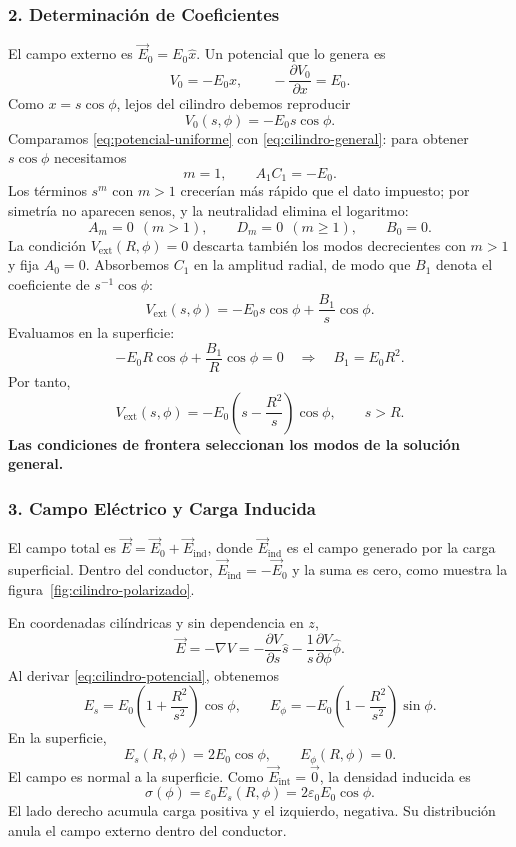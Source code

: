 \documentclass[11pt]{article}
\begin{document}
\subsubsection*{2. Determinación de Coeficientes}
El campo externo es $\vec{E}_0=E_0\hat{x}$. Un potencial que lo genera es
\[
 V_0=-E_0x,
 \qquad -\frac{\partial V_0}{\partial x}=E_0.
\]
Como $x=s\cos\phi$, lejos del cilindro debemos reproducir
\begin{equation}
 V_0(s,\phi)=-E_0s\cos\phi.
 \label{eq:potencial-uniforme}
\end{equation}
Comparamos \eqref{eq:potencial-uniforme} con
\eqref{eq:cilindro-general}: para obtener $s\cos\phi$ necesitamos
\[
 m=1,\qquad A_1C_1=-E_0.
\]
Los términos $s^m$ con $m>1$ crecerían más rápido que el dato impuesto;
por simetría no aparecen senos, y la neutralidad elimina el logaritmo:
\[
 A_m=0\ \ (m>1),\qquad D_m=0\ \ (m\geq1),\qquad B_0=0.
\]
La condición $V_{\mathrm{ext}}(R,\phi)=0$ descarta también los modos
decrecientes con $m>1$ y fija $A_0=0$. Absorbemos $C_1$ en la amplitud
radial, de modo que $B_1$ denota el coeficiente de $s^{-1}\cos\phi$:
\[
 V_{\mathrm{ext}}(s,\phi)
 =-E_0s\cos\phi+\frac{B_1}{s}\cos\phi.
\]
Evaluamos en la superficie:
\[
 -E_0R\cos\phi+\frac{B_1}{R}\cos\phi=0
 \quad\Longrightarrow\quad B_1=E_0R^2.
\]
Por tanto,
\begin{equation}
 \boxed{V_{\mathrm{ext}}(s,\phi)
 =-E_0\left(s-\frac{R^2}{s}\right)\cos\phi,\qquad s>R.}
 \label{eq:cilindro-potencial}
\end{equation}
\textbf{Las condiciones de frontera seleccionan los modos de la
solución general.}

\subsubsection*{3. Campo Eléctrico y Carga Inducida}
El campo total es $\vec E=\vec E_0+\vec E_{\mathrm{ind}}$, donde
$\vec E_{\mathrm{ind}}$ es el campo generado por la carga superficial.
Dentro del conductor, $\vec E_{\mathrm{ind}}=-\vec E_0$ y la suma es cero,
como muestra la figura~\ref{fig:cilindro-polarizado}.

En coordenadas cilíndricas y sin dependencia en $z$,
\[
 \vec{E}=-\nabla V
 =-\frac{\partial V}{\partial s}\hat{s}
  -\frac1s\frac{\partial V}{\partial\phi}\hat{\phi}.
\]
Al derivar \eqref{eq:cilindro-potencial}, obtenemos
\begin{equation}
 \boxed{E_s=E_0\left(1+\frac{R^2}{s^2}\right)\cos\phi,
 \qquad E_\phi=-E_0\left(1-\frac{R^2}{s^2}\right)\sin\phi.}
 \label{eq:cilindro-campo}
\end{equation}
En la superficie,
\[
 E_s(R,\phi)=2E_0\cos\phi,\qquad E_\phi(R,\phi)=0.
\]
El campo es normal a la superficie. Como $\vec{E}_{\mathrm{int}}=\vec{0}$,
la densidad inducida es
\begin{equation}
 \boxed{\sigma(\phi)=\varepsilon_0E_s(R,\phi)
 =2\varepsilon_0E_0\cos\phi.}
 \label{eq:cilindro-sigma}
\end{equation}
El lado derecho acumula carga positiva y el izquierdo, negativa.
Su distribución anula el campo externo dentro del conductor.
\end{document}

